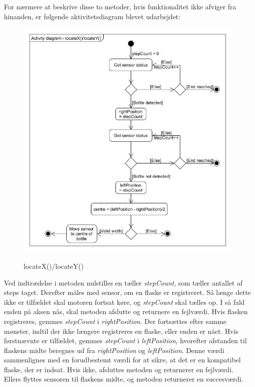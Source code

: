 For nærmere at beskrive disse to metoder, hvis funktionalitet ikke afviger fra hinanden, er følgende aktivitetsdiagram blevet udarbejdet: \\

\begin{figure}[H]
	\includegraphics[scale=0.5]{tex/Design/PSoC/AD_locate.jpg}
	\label{AD_locate}
	\caption{locateX()/locateY()}
\end{figure}

Ved indtrædelse i metoden nulstilles en tæller \textit{stepCount}, som tæller antallet af steps taget. Derefter måles med sensor, om en flaske er registreret. Så længe dette ikke er tilfældet skal motoren fortsat køre, og \textit{stepCount} skal tælles op. I så fald enden på aksen nås, skal metoden afslutte og returnere en fejlværdi. Hvis flasken registreres, gemmes \textit{stepCount} i \textit{rightPosition}. Der fortsættes efter samme mønster, indtil der ikke længere registreres en flaske, eller enden er nået. Hvis førstnævnte er tilfældet, gemmes \textit{stepCount} i \textit{leftPosition}, hvorefter afstanden til flaskens midte beregnes ud fra \textit{rightPosition} og \textit{leftPosition}. Denne værdi sammenlignes med en forudbestemt værdi for at sikre, at det er en kompatibel flaske, der er indsat. Hvis ikke, afsluttes metoden og returnerer en fejlværdi. Ellers flyttes sensoren til flaskens midte, og metoden returnerer en succesværdi.

